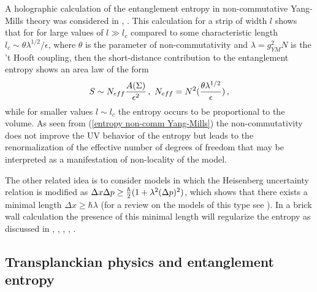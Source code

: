 \documentclass[12pt]{article}
\def\be{\begin{eqnarray}}
\def\ee{\end{eqnarray}}
\def\lb{\label}
\def\o{\over}
\begin{document}
A holographic calculation of the entanglement entropy in non-commutative Yang-Mills theory was considered in  \cite{Barbon:2008ut}, \cite{Barbon:2008sr}.
This calculation for a strip of width $l$ shows that for for large values of $l\gg l_c$ compared to some characteristic length $l_c\sim {\theta {\lambda^{1/2}}/\epsilon}$, where $\theta$ is the parameter of non-commutativity and $\lambda=g^2_{YM}N$ is the 't Hooft coupling, then the short-distance contribution to the entanglement entropy shows an area law of the form
\be
S\sim N_{eff}{A(\Sigma)\o \epsilon^2}\, , \ N_{eff}=N^2({\theta\lambda^{1/2}\o \epsilon})\, ,
\lb{entropy non-comm Yang-Mills}
\ee
while for smaller values $l\sim l_c$ the entropy occurs to be proportional to the volume. As  seen from (\ref{entropy non-comm Yang-Mills}) the non-commutativity does not improve
the UV behavior of the entropy but leads to the renormalization of the effective number of degrees of freedom that may be interpreted as a manifestation of non-locality of the model.
 

The other related idea is to consider models in which the Heisenberg uncertainty relation is modified as $\Delta x\Delta p\geq {\hbar\o 2}(1+{\lambda^2}(\Delta p)^2)$, which shows that there exists a minimal length $\Delta x\geq \hbar {\lambda}$ (for a review on the models of this type   see \cite{Garay:1994en}). In a brick wall calculation  the presence of this minimal length 
will regularize the entropy as discussed in \cite{Brustein:2010ms}, \cite{Yoon:2007aj}, \cite{Sun:2004ct}, \cite{Kim:2006hk}, \cite{Kim:2007if}. 



\subsection{Transplanckian physics and entanglement entropy}
\end{document}

